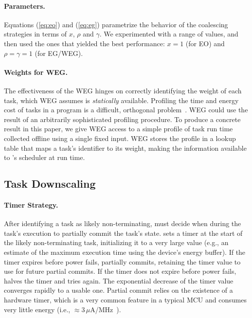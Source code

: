 \paragraph{Parameters.}
Equations (\ref{eq:eo}) and (\ref{eq:eg}) parametrize the behavior of the coalescing strategies in terms of $x$, $\rho$ and $\gamma$.
We experimented with a range of values, and then used the ones that yielded the best performance: $x = 1$ (for EO) and $\rho = \gamma = 1$ (for EG/WEG).

\paragraph{Weights for WEG.}
The effectiveness of the WEG hinges on correctly identifying the weight of each task, which WEG assumes is {\em statically} available. Profiling the time and energy cost of tasks in a program is a difficult, orthogonal problem~\cite{cleancut_2018,baghsorkhi_cgo_2018}. WEG could use the result of an arbitrarily sophisticated profiling procedure. To produce a concrete result in this paper, we give WEG access to a simple profile of task run time collected offline using a single fixed input. WEG stores the profile in a lookup table that maps a task's identifier to its weight, making the information available to \sys's scheduler at run time.

%
\subsection{Task Downscaling}
%
%
\paragraph{Timer Strategy.}
After identifying a task as likely non-terminating, \sys must decide when during the task's execution to partially commit the task's state. \sys sets a timer at the start of the likely non-terminating task, initializing it to a very large value (e.g., an estimate of the maximum execution time using the device's energy buffer). If the timer expires before power fails, \sys partially commits, retaining  the timer value to use for future partial commits. If the timer does not expire before power fails, \sys halves the timer and tries again. The exponential decrease of the timer value converges rapidly to a usable one.
%
Partial commit relies on the existence of a hardware timer, which is a very
common feature in a typical MCU and consumes very little energy (i.e.,
$\approx$3\,$\mu$A/MHz~\cite{msp430datasheet}).  

